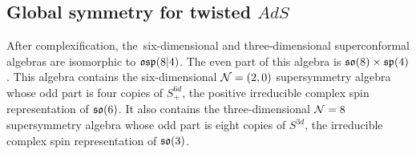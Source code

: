 %
%
%
%
%

\subsection{Global symmetry for twisted $AdS$}
\label{s:global1}

After complexification, the~six-dimensional and three-dimensional superconformal algebras are isomorphic to $\mathfrak{osp}(8|4)$.
The even part of this algebra is $\mathfrak{so}(8) \times \mathfrak{sp}(4)$.
This algebra contains the six-dimensional $\mathcal N=(2,0)$ supersymmetry algebra whose odd part is four copies of $S^{6d}_+$, the positive irreducible complex spin representation of $\mathfrak{so}(6)$.
It also contains the three-dimensional $\mathcal N=8$ supersymmetry algebra whose odd part is eight copies of $S^{3d}$, the irreducible complex spin representation of $\mathfrak{so}(3)$. 

